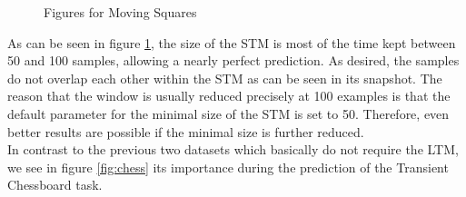 \documentclass[conference]{IEEEtran}
\begin{document}
\begin{figure}
\centering
	\vspace{0 pt}
\caption{Figures for Moving Squares}
\label{fig:squares}
\end{figure}
As can be seen in figure \ref{fig:squares}, the size of the STM is most of the time kept between 50 and 100 samples, allowing a nearly perfect prediction. 
As desired, the samples do not overlap each other within the STM as can be seen in its snapshot. 
The reason that the window is usually reduced precisely at 100 examples is that the default parameter for the minimal size of the STM is set to 50. Therefore,
even better results are possible if the minimal size is further reduced.\\
In contrast to the previous two datasets which basically do not require the LTM, we see in figure \ref{fig:chess} its importance during the prediction of the Transient Chessboard task.
\end{document}
